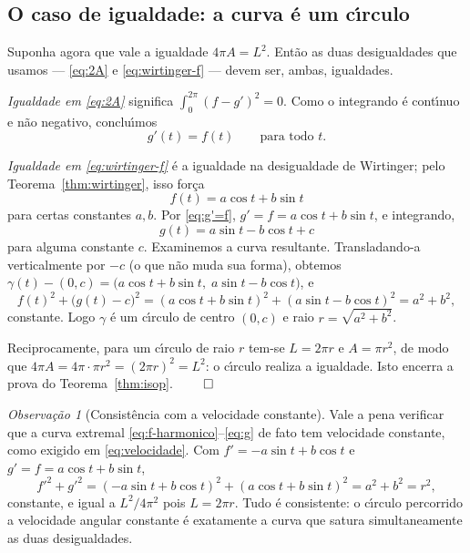 \documentclass[11pt,a4paper]{amsart}
\theoremstyle{plain}
\theoremstyle{definition}
\theoremstyle{remark}
\newtheorem{observacao}[teorema]{Observação}
\begin{document}
\subsection{O caso de igualdade: a curva \'e um c\'\i rculo}

Suponha agora que vale a igualdade $4\pi A = L^2$. Ent\~ao as duas
desigualdades que usamos --- \eqref{eq:2A} e \eqref{eq:wirtinger-f} --- devem
ser, ambas, igualdades.

\emph{Igualdade em \eqref{eq:2A}} significa $\int_0^{2\pi}(f-g')^2 = 0$.
Como o integrando \'e cont\'\i nuo e n\~ao negativo, conclu\'\i mos
\begin{equation}\label{eq:g'=f}
  g'(t) = f(t) \qquad\text{para todo }t .
\end{equation}

\emph{Igualdade em \eqref{eq:wirtinger-f}} \'e a igualdade na desigualdade de
Wirtinger; pelo Teorema~\ref{thm:wirtinger}, isso for\c{c}a
\begin{equation}\label{eq:f-harmonico}
  f(t) = a\cos t + b\sin t
\end{equation}
para certas constantes $a,b$. Por \eqref{eq:g'=f}, $g'=f=a\cos t+b\sin t$,
e integrando,
\begin{equation}\label{eq:g}
  g(t) = a\sin t - b\cos t + c
\end{equation}
para alguma constante $c$. Examinemos a curva resultante. Transladando-a
verticalmente por $-c$ (o que n\~ao muda sua forma), obtemos
$\gamma(t)-(0,c) = \big(a\cos t + b\sin t,\; a\sin t - b\cos t\big)$, e
\[
  f(t)^2 + \big(g(t)-c\big)^2
  = (a\cos t + b\sin t)^2 + (a\sin t - b\cos t)^2
  = a^2 + b^2 ,
\]
constante. Logo $\gamma$ \'e um c\'\i rculo de centro $(0,c)$ e raio
$r=\sqrt{a^2+b^2}$.

Reciprocamente, para um c\'\i rculo de raio $r$ tem-se $L=2\pi r$ e
$A=\pi r^2$, de modo que $4\pi A = 4\pi\cdot\pi r^2 = (2\pi r)^2 = L^2$: o
c\'\i rculo realiza a igualdade. Isto encerra a prova do
Teorema~\ref{thm:isop}.
\hfill$\qed$

\begin{observacao}[Consist\^encia com a velocidade constante]
Vale a pena verificar que a curva extremal \eqref{eq:f-harmonico}--\eqref{eq:g}
de fato tem velocidade constante, como exigido em \eqref{eq:velocidade}. Com
$f'=-a\sin t+b\cos t$ e $g'=f=a\cos t+b\sin t$,
\[
  f'^2 + g'^2
  = (-a\sin t+b\cos t)^2 + (a\cos t+b\sin t)^2 = a^2+b^2 = r^2 ,
\]
constante, e igual a $L^2/4\pi^2$ pois $L=2\pi r$. Tudo \'e consistente: o
c\'\i rculo percorrido a velocidade angular constante \'e exatamente a curva
que satura simultaneamente as duas desigualdades.
\end{observacao}
\end{document}
